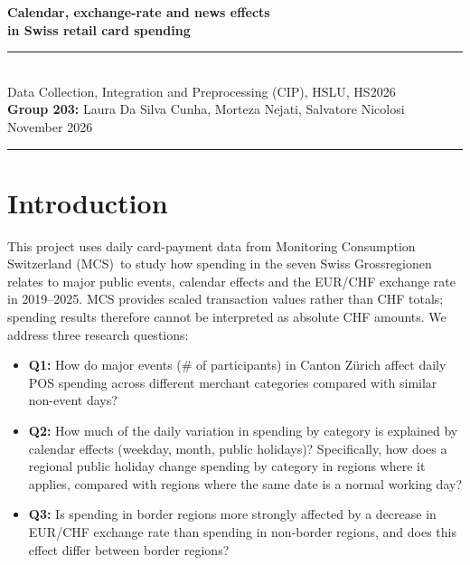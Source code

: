 \documentclass[10pt]{article}
\let\plainsection\section
\renewcommand{\section}{\Needspace*{6\baselineskip}\plainsection}
\begin{document}
\color{charcoal}
\thispagestyle{empty}

\begin{center}
{\fontsize{19}{23}\selectfont\bfseries\color{navy} Calendar, exchange-rate and news effects\\[1pt] in Swiss retail card spending}\\[7pt]
{\color{bluerule}\rule{0.18\textwidth}{0.8pt}}\\[6pt]
{\normalsize Data Collection, Integration and Preprocessing (CIP), HSLU, HS2026}\\[3pt]
{\normalsize \textbf{Group 203:} Laura Da Silva Cunha, Morteza Nejati, Salvatore Nicolosi}\\[3pt]
{\small\color{muted} November 2026}
\end{center}
\vspace{2pt}
{\color{bluerule}\rule{\textwidth}{0.4pt}}
\vspace{-6pt}

\section{Introduction}
This project uses daily card-payment data from Monitoring Consumption Switzerland (MCS)\,\cite{mcs} to study how spending in the seven Swiss Grossregionen relates to major public events, calendar effects and the EUR/CHF exchange rate in 2019--2025. MCS provides scaled transaction values rather than CHF totals; spending results therefore cannot be interpreted as absolute CHF amounts. We address three research questions:
\begin{itemize}
\item \textbf{Q1:} How do major events (\# of participants) in Canton Zürich affect daily POS spending across different merchant categories compared with similar non-event days?
\item \textbf{Q2:} How much of the daily variation in spending by category is explained by calendar effects (weekday, month, public holidays)? Specifically, how does a regional public holiday change spending by category in regions where it applies, compared with regions where the same date is a normal working day?
\item \textbf{Q3:} Is spending in border regions more strongly affected by a decrease in EUR/CHF exchange rate than spending in non-border regions, and does this effect differ between border regions?
\end{itemize}
\end{document}
